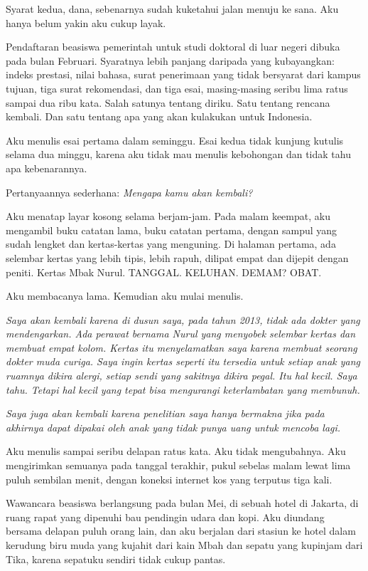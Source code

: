 \documentclass[11pt,twoside,openany]{book}
\makeatletter
\newcommand{\scenebreak}{\par\vspace{0.9em}{\centering\textsc{*\hspace{0.7em}*\hspace{0.7em}*}\par}\vspace{0.9em}\@afterindentfalse\@afterheading}
\makeatother
\begin{document}
\scenebreak
Syarat kedua, dana, sebenarnya sudah kuketahui jalan menuju ke sana. Aku hanya belum yakin aku cukup layak.

Pendaftaran beasiswa pemerintah untuk studi doktoral di luar negeri dibuka pada bulan Februari. Syaratnya lebih panjang daripada yang kubayangkan: indeks prestasi, nilai bahasa, surat penerimaan yang tidak bersyarat dari kampus tujuan, tiga surat rekomendasi, dan tiga esai, masing-masing seribu lima ratus sampai dua ribu kata. Salah satunya tentang diriku. Satu tentang rencana kembali. Dan satu tentang apa yang akan kulakukan untuk Indonesia.

Aku menulis esai pertama dalam seminggu. Esai kedua tidak kunjung kutulis selama dua minggu, karena aku tidak mau menulis kebohongan dan tidak tahu apa kebenarannya.

Pertanyaannya sederhana: \emph{Mengapa kamu akan kembali?}

Aku menatap layar kosong selama berjam-jam. Pada malam keempat, aku mengambil buku catatan lama, buku catatan pertama, dengan sampul yang sudah lengket dan kertas-kertas yang menguning. Di halaman pertama, ada selembar kertas yang lebih tipis, lebih rapuh, dilipat empat dan dijepit dengan peniti. Kertas Mbak Nurul. TANGGAL. KELUHAN. DEMAM? OBAT.

Aku membacanya lama. Kemudian aku mulai menulis.

\emph{Saya akan kembali karena di dusun saya, pada tahun 2013, tidak ada dokter yang mendengarkan. Ada perawat bernama Nurul yang menyobek selembar kertas dan membuat empat kolom. Kertas itu menyelamatkan saya karena membuat seorang dokter muda curiga. Saya ingin kertas seperti itu tersedia untuk setiap anak yang ruamnya dikira alergi, setiap sendi yang sakitnya dikira pegal. Itu hal kecil. Saya tahu. Tetapi hal kecil yang tepat bisa mengurangi keterlambatan yang membunuh.}

\emph{Saya juga akan kembali karena penelitian saya hanya bermakna jika pada akhirnya dapat dipakai oleh anak yang tidak punya uang untuk mencoba lagi.}

Aku menulis sampai seribu delapan ratus kata. Aku tidak mengubahnya. Aku mengirimkan semuanya pada tanggal terakhir, pukul sebelas malam lewat lima puluh sembilan menit, dengan koneksi internet kos yang terputus tiga kali.

\scenebreak
Wawancara beasiswa berlangsung pada bulan Mei, di sebuah hotel di Jakarta, di ruang rapat yang dipenuhi bau pendingin udara dan kopi. Aku diundang bersama delapan puluh orang lain, dan aku berjalan dari stasiun ke hotel dalam kerudung biru muda yang kujahit dari kain Mbah dan sepatu yang kupinjam dari Tika, karena sepatuku sendiri tidak cukup pantas.
\end{document}
